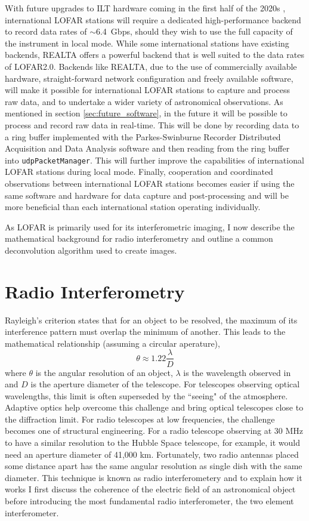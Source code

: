 With future upgrades to ILT hardware coming in the first half of the 2020s \citep[mainly, LOFAR2.0;][]{Edler2021}, international LOFAR stations will require a dedicated high-performance backend to record data rates of $\sim$6.4~Gbps, should they wish to use the full capacity of the instrument in local mode. While some international stations have existing backends, REALTA offers a powerful backend that is well suited to the data rates of LOFAR2.0. Backends like REALTA, due to the use of commercially available hardware, straight-forward network configuration and freely available software, will make it possible for international LOFAR stations to capture and process raw data, and to undertake a wider variety of astronomical observations. As mentioned in section \ref{sec:future_software}, in the future it will be possible to process and record raw data in real-time. This will be done by recording data to a ring buffer implemented with the Parkes-Swinburne Recorder Distributed Acquisition and Data Analysis software \citep[PSRDADA;][]{PSRDADA} and then reading from the ring buffer into \texttt{udpPacketManager}. This will further improve the capabilities of international LOFAR stations during local mode. Finally, cooperation and coordinated observations between international LOFAR stations becomes easier if using the same software and hardware for data capture and post-processing and will be more beneficial than each international station operating individually.

As LOFAR is primarily used for its interferometric imaging, I now describe the mathematical background for radio interferometry and outline a common deconvolution algorithm used to create images. 

\section{Radio Interferometry}
\label{sec:interferometry}
Rayleigh's criterion states that for an object to be resolved, the maximum of its interference pattern must overlap the minimum of another. This leads to the mathematical relationship (assuming a circular aperature), 
$$\theta \approx 1.22 \frac{\lambda}{D}$$ 
where $\theta$ is the angular resolution of an object, $\lambda$ is the wavelength observed in and $D$ is the aperture diameter of the telescope. For telescopes observing optical wavelengths, this limit is often superseded by the ``seeing" of the atmosphere. Adaptive optics help overcome this challenge and bring optical telescopes close to the diffraction limit. For radio telescopes at low frequencies, the challenge becomes one of structural engineering. For a radio telescope observing at 30 MHz to have a similar resolution to the Hubble Space telescope, for example, it would need an aperture diameter of 41,000 km. Fortunately, two radio antennas placed some distance apart has the same angular resolution as single dish with the same diameter. This technique is known as radio interferometery and to explain how it works I first discuss the coherence of the electric field of an astronomical object before introducing the most fundamental radio interferometer, the two element interferometer.

